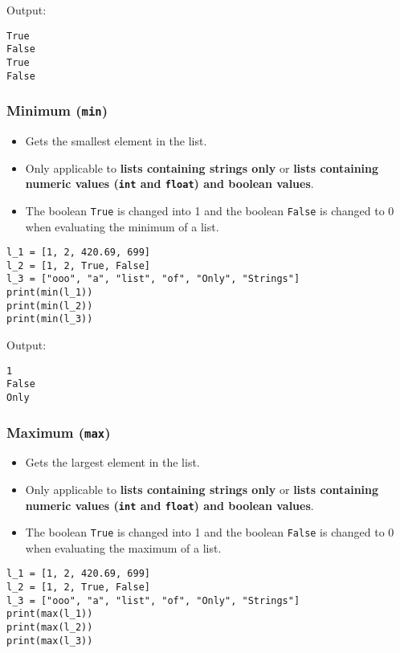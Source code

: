 \documentclass[11pt]{article}
\begin{document}
 \noindent Output:

\label{orgbc3f2fb}
\begin{verbatim}
True
False
True
False
\end{verbatim}
\subsubsection{Minimum (\texttt{min})}
\label{sec:org40c5702}
\begin{itemize}
\item Gets the smallest element in the list.
\item Only applicable to \textbf{lists containing strings only} or \textbf{lists containing numeric values (\texttt{int} and \texttt{float}) and boolean values}.
\item The boolean \texttt{True} is changed into 1 and the boolean \texttt{False} is changed to 0 when evaluating the minimum of a list.
\end{itemize}

\begin{verbatim}
l_1 = [1, 2, 420.69, 699]
l_2 = [1, 2, True, False]
l_3 = ["ooo", "a", "list", "of", "Only", "Strings"]
print(min(l_1))
print(min(l_2))
print(min(l_3))
\end{verbatim}

 \noindent Output:

\label{org269aeab}
\begin{verbatim}
1
False
Only
\end{verbatim}
\subsubsection{Maximum (\texttt{max})}
\label{sec:orgf4c5f56}
\begin{itemize}
\item Gets the largest element in the list.
\item Only applicable to \textbf{lists containing strings only} or \textbf{lists containing numeric values (\texttt{int} and \texttt{float}) and boolean values}.
\item The boolean \texttt{True} is changed into 1 and the boolean \texttt{False} is changed to 0 when evaluating the maximum of a list.
\end{itemize}

\begin{verbatim}
l_1 = [1, 2, 420.69, 699]
l_2 = [1, 2, True, False]
l_3 = ["ooo", "a", "list", "of", "Only", "Strings"]
print(max(l_1))
print(max(l_2))
print(max(l_3))
\end{verbatim}
\end{document}
